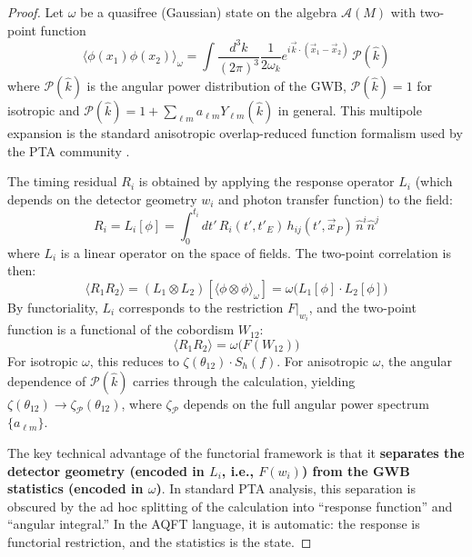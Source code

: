 \documentclass[11pt,a4paper]{article}
\begin{document}
\begin{proof}
Let $\omega$ be a quasifree (Gaussian) state on the algebra $\mathcal{A}(M)$ with two-point function
\begin{equation}
\langle \phi(x_1) \phi(x_2) \rangle_\omega = \int \frac{d^3k}{(2\pi)^3} \frac{1}{2\omega_k} e^{i\vec{k}\cdot(\vec{x}_1-\vec{x}_2)} \, \mathcal{P}(\hat{k})
\end{equation}
where $\mathcal{P}(\hat{k})$ is the angular power distribution of the GWB, $\mathcal{P}(\hat{k}) = 1$ for isotropic and $\mathcal{P}(\hat{k}) = 1 + \sum_{\ell m} a_{\ell m} Y_{\ell m}(\hat{k})$ in general. This multipole expansion is the standard anisotropic overlap-reduced function formalism used by the PTA community \cite{Allen:2023,AliHaimoud:2020,Depta:2024}.

The timing residual $R_i$ is obtained by applying the response operator $L_i$ (which depends on the detector geometry $w_i$ and photon transfer function) to the field:
\begin{equation}
R_i = L_i[\phi] = \int_0^{t_i} dt' \, R_i(t', t'_E) \, h_{ij}(t', \vec{x}_P) \, \hat{n}^i \hat{n}^j
\end{equation}
where $L_i$ is a linear operator on the space of fields. The two-point correlation is then:
\begin{equation}
\langle R_1 R_2 \rangle = (L_1 \otimes L_2)[\langle \phi \otimes \phi \rangle_\omega] = \omega\bigl(L_1[\phi] \cdot L_2[\phi]\bigr)
\end{equation}
By functoriality, $L_i$ corresponds to the restriction $F|_{w_i}$, and the two-point function is a functional of the cobordism $W_{12}$:
\begin{equation}
\langle R_1 R_2 \rangle = \omega\bigl(F(W_{12})\bigr)
\end{equation}
For isotropic $\omega$, this reduces to $\zeta(\theta_{12}) \cdot S_h(f)$. For anisotropic $\omega$, the angular dependence of $\mathcal{P}(\hat{k})$ carries through the calculation, yielding $\zeta(\theta_{12}) \to \zeta_{\mathcal{P}}(\theta_{12})$, where $\zeta_{\mathcal{P}}$ depends on the full angular power spectrum $\{a_{\ell m}\}$.

The key technical advantage of the functorial framework is that it \textbf{separates the detector geometry (encoded in $L_i$, i.e., $F(w_i)$) from the GWB statistics (encoded in $\omega$)}. In standard PTA analysis, this separation is obscured by the ad hoc splitting of the calculation into ``response function'' and ``angular integral.'' In the AQFT language, it is automatic: the response is functorial restriction, and the statistics is the state.
\end{proof}
\end{document}
